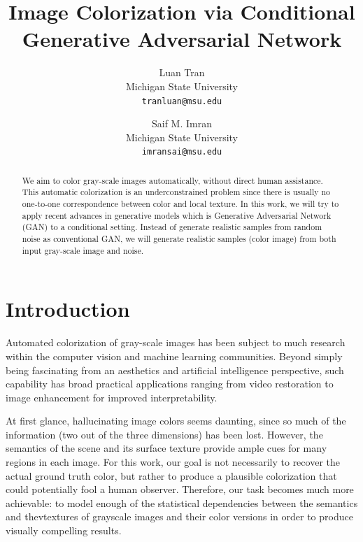 \documentclass[10pt,twocolumn,letterpaper]{article}
\begin{document}
\title{Image Colorization via Conditional Generative Adversarial Network}

\author{Luan Tran\\
Michigan State University\\
{\tt\small tranluan@msu.edu}
\and
Saif M. Imran\\
Michigan State University\\
{\tt\small imransai@msu.edu}
}

\maketitle

\begin{abstract}
We aim to color gray-scale images automatically, without direct human assistance.
This automatic colorization is an underconstrained problem 
since there is usually no one-to-one correspondence between color and local texture.
In this work, we will try to apply recent advances in generative models which is Generative Adversarial Network~\cite{goodfellow2014generative} (GAN) to a conditional setting. Instead of generate realistic samples from random noise as conventional GAN, we will generate realistic samples (color image) from both input gray-scale image and noise.
\end{abstract}

\section{Introduction}

Automated colorization of gray-scale images has been subject to much research within the computer vision and machine learning communities. Beyond simply being fascinating from an aesthetics and artificial intelligence perspective, such capability has broad practical applications ranging from video restoration to image enhancement for
improved interpretability. 

At first glance, hallucinating image colors seems daunting, since so much of the information (two out of the
three dimensions) has been lost. However, the semantics of the scene and its surface texture provide ample cues for many regions in each image. For this work, our goal is not necessarily to recover the actual ground truth color, but rather to produce a plausible colorization that could potentially fool a human observer. Therefore, our task becomes much more achievable: to model enough of the statistical dependencies between the semantics and thevtextures of grayscale images and their color versions in order to produce visually compelling results.
\end{document}

